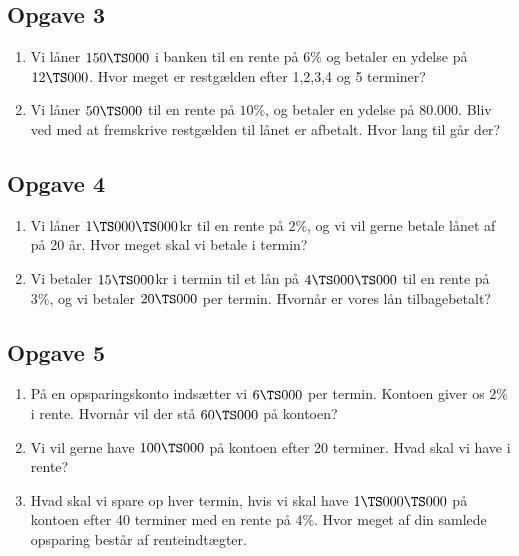 \subsection*{Opgave 3}
\begin{enumerate}[label=\roman*)]
\item Vi låner $150 \TS000$ i banken til en rente på $6\%$ og betaler en ydelse på $12 \TS 000$. Hvor meget er restgælden efter 1,2,3,4 og 5 terminer?
\item Vi låner $50 \TS 000$ til en rente på $10\%$, og betaler en ydelse på 80.000. Bliv ved med at fremskrive restgælden til lånet er afbetalt. Hvor lang til går der?
\end{enumerate}

\subsection*{Opgave 4}
\begin{enumerate}[label=\roman*)]
\item Vi låner $1\TS 000 \TS 000 $kr til en rente på $2\%$, og vi vil gerne betale lånet af på 20 år. Hvor meget skal vi betale i termin?
\item Vi betaler $15 \TS 000$kr i termin til et lån på $4\TS 000 \TS 000$ til en rente på $3\%$, og vi betaler $20 \TS 000$ per termin. Hvornår er vores lån tilbagebetalt?
\end{enumerate}

\subsection*{Opgave 5}
\begin{enumerate}[label=\roman*)]
	\item På en opsparingskonto indsætter vi $6 \TS 000$ per termin. Kontoen giver os $2\%$ i rente. Hvornår
	vil der stå $60 \TS 000$ på kontoen?
	\item Vi vil gerne have $100 \TS 000$ på kontoen efter 20 terminer. Hvad skal vi have i rente?
	\item Hvad skal vi spare op hver termin, hvis vi skal have $1\TS 000 \TS 000$ på kontoen efter 40 terminer 
	med en rente på $4\%$. Hvor meget af din samlede opsparing består af renteindtægter.
\end{enumerate}


